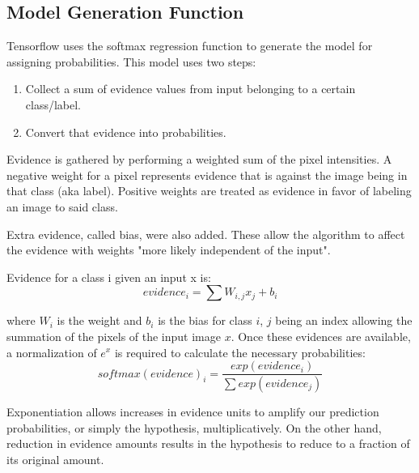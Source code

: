 \documentclass[11pt]{article}
\begin{document}
\subsection{Model Generation Function}
Tensorflow uses the softmax regression function to generate the model for assigning probabilities.  This model uses two steps:
\begin{enumerate}
  \item Collect a sum of evidence values from input belonging to a certain class/label.
  \item Convert that evidence into probabilities.
\end{enumerate}
Evidence is gathered by performing a weighted sum of the pixel intensities.  A negative weight for a pixel represents evidence that is against the image being in that class (aka label).  Positive weights are treated as evidence in favor of labeling an image to said class.

Extra evidence, called bias, were also added.  These allow the algorithm to affect the evidence with weights "more likely independent of the input".

Evidence for a class i given an input x is:
\begin{equation}
    evidence_{i} = \sum W_{i,j}x_{j} + b_{i}
\end{equation}


where $W_{i}$ is the weight and $b_{i}$ is the bias for class $i$, $j$ being an index allowing the summation of the pixels of the input image $x$.  
Once these evidences are available, a normalization of $e^x$ is required to calculate the necessary probabilities:
\begin{equation}
    softmax(evidence)_{i} = \frac{exp(evidence_{i})}{\sum exp(evidence_{j})}
\end{equation}

Exponentiation allows increases in evidence units to amplify our prediction probabilities, or simply the hypothesis, multiplicatively.  On the other hand, reduction in evidence amounts results in the hypothesis to reduce to a fraction of its original amount.
\end{document}
